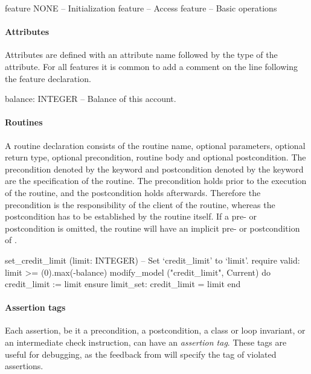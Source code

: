\begin{erunning}
feature {NONE} -- Initialization
feature -- Access
feature -- Basic operations
\end{erunning}

\paragraph{Attributes}

Attributes are defined with an attribute name followed by the type of the attribute. For all features it is common to add a comment on the line following the feature declaration.

\begin{erunning}
	balance: INTEGER
		-- Balance of this account.
\end{erunning}

\paragraph{Routines}

A routine declaration consists of the routine name, optional parameters, optional return type, optional precondition, routine body and optional postcondition. The precondition denoted by the  keyword and postcondition denoted by the  keyword are the specification of the routine. The precondition holds prior to the execution of the routine, and the postcondition holds afterwards. Therefore the precondition is the responsibility of the client of the routine, whereas the postcondition has to be established by the routine itself. If a pre- or postcondition is omitted, the routine will have an implicit pre- or postcondition of .

\begin{erunning}
	set_credit_limit (limit: INTEGER)
			-- Set `credit_limit' to `limit'.
		require
			valid: limit >= (0).max(-balance)
			modify_model ("credit_limit", Current)
		do
			credit_limit := limit
		ensure
			limit_set: credit_limit = limit
		end
\end{erunning}

\paragraph{Assertion tags}

Each assertion, be it a precondition, a postcondition, a class or loop invariant, or an intermediate check instruction, can have an \emph{assertion tag}. These tags are useful for debugging, as the feedback from \AutoProof will specify the tag of violated assertions.

